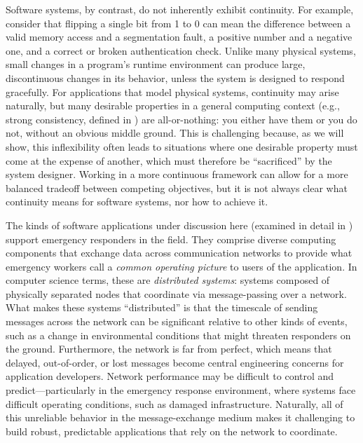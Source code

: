 \documentclass[]             %
{NASA}                       %
\theoremstyle{definition}
\begin{document}
Software systems, by contrast, do not inherently exhibit continuity. For example, consider that flipping a single bit from 1 to 0 can mean the difference between a valid memory access and a segmentation fault, a positive number and a negative one, and a correct or broken authentication check. Unlike many physical systems, small changes in a program's runtime environment can produce large, discontinuous changes in its behavior, unless the system is designed to respond gracefully. For applications that model physical systems, continuity may arise naturally, but many desirable properties in a general computing context (e.g., strong consistency, defined in ) are all-or-nothing: you either have them or you do not, without an obvious middle ground. This is challenging because, as we will show, this inflexibility often leads to situations where one desirable property must come at the expense of another, which must therefore be ``sacrificed'' by the system designer. Working in a more continuous framework can allow for a more balanced tradeoff between competing objectives, but it is not always clear what continuity means for software systems, nor how to achieve it.

The kinds of software applications under discussion here (examined in detail in ) support emergency responders in the field. They comprise diverse computing components that exchange data across communication networks to provide what emergency workers call a \emph{common operating picture} to users of the application. In computer science terms, these are \emph{distributed systems}: systems composed of physically separated nodes that coordinate via message-passing over a network. What makes these systems ``distributed'' is that the timescale of sending messages across the network can be significant relative to other kinds of events, such as a change in environmental conditions that might threaten responders on the ground. Furthermore, the network is far from perfect, which means that delayed, out-of-order, or lost messages become central engineering concerns for application developers. Network performance may be difficult to control and predict---particularly in the emergency response environment, where systems face difficult operating conditions, such as damaged infrastructure. Naturally, all of this unreliable behavior in the message-exchange medium makes it challenging to build robust, predictable applications that rely on the network to coordinate.
\end{document}
